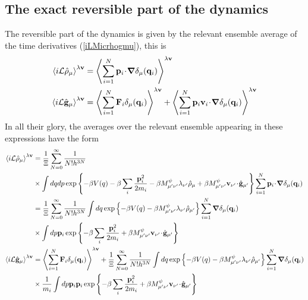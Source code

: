 \documentclass[b5paper,openright,11pt]{book}
\newcommand{\esc}{\!\cdot\!}
\newcommand{\llangle}{\left\langle}
\newcommand{\rrangle}{\right\rangle}
\begin{document}
\begin{appendices}
\section{The exact reversible part of the dynamics}
The reversible part of the dynamics  is given by the relevant ensemble
average of  the time derivatives
(\ref{iLMicrhogmu}), this is
\begin{align}
  \llangle i{\cal L}\hat{\rho}_\mu\rrangle^{\lambda{\bf v}} &=\llangle \sum_{i=1}^N{\bf p}_i\esc\boldsymbol{\nabla}\delta_\mu({\bf q}_i)\rrangle^{\lambda{\bf v}}
\nonumber\\
  \llangle i{\cal L}\hat{\bf g}_\mu\rrangle^{\lambda{\bf v}} &=
  \llangle \sum_{i=1}^N{\bf F}_i\delta_\mu({\bf q}_i)\rrangle^{\lambda{\bf v}}
+  \llangle \sum_{i=1}^N{\bf p}_i{\bf v}_i\esc\boldsymbol{\nabla}\delta_\mu({\bf q}_i)\rrangle^{\lambda{\bf v}}
\end{align}
In all their glory, the  averages over the relevant ensemble appearing
in these expressions have the form
\begin{align}
  \llangle i{\cal L}\hat{\rho}_\mu\rrangle^{\lambda{\bf v}} &= 
\frac{1}{\Xi} \sum_{N=0}^\infty \frac{1}{N!h^{3N}} \nonumber\\
&\times \int dq dp 
\exp\left\{-\beta V(q)-\beta \sum_i\frac{{\bf p}_i^2}{2m_i}-\beta M^\psi_{\mu'\nu'}\lambda_{\nu'}\hat{\rho}_{\mu}+\beta M^\psi_{\mu'\nu' }{\bf v}_{\nu'}\esc\hat{\bf g}_{\mu'}\right\}\sum_{i=1}^N{\bf p}_i\esc\boldsymbol{\nabla}\delta_\mu({\bf q}_i)
\nonumber\\
&= 
\frac{1}{\Xi} \sum_{N=0}^\infty \frac{1}{N!h^{3N}}\int dq  
\exp\left\{-\beta V(q)-\beta M^\psi_{\mu'\nu'}\lambda_{\nu'} \hat{\rho}_{\mu'}\right\}\sum_{i=1}^N\boldsymbol{\nabla}\delta_\mu({\bf q}_i)
\nonumber\\
&\times \int dp{\bf p}_i\exp\left\{-\beta \sum_i\frac{{\bf p}_i^2}{2m_i}+\beta M^\psi_{\mu'\nu'}{\bf v}_{\nu'}\esc\hat{\bf g}_{\mu'}\right\}
\nonumber\\
  \llangle i{\cal L}\hat{\bf g}_\mu\rrangle^{\lambda{\bf v}} &=
  \llangle \sum_{i=1}^N{\bf F}_i\delta_\mu({\bf q}_i)\rrangle^{\lambda{\bf v}}
+\frac{1}{\Xi} \sum_{N=0}^\infty \frac{1}{N!h^{3N}}\int dq 
\exp\left\{-\beta V(q)-\beta M^\psi_{\mu'\nu'}\lambda_{\nu'}\hat{\rho}_{\mu'}\right\}\sum_{i=1}^N\boldsymbol{\nabla}\delta_\mu({\bf q}_i)
\nonumber\\
&\times\frac{1}{m_i} \int dp{\bf p}_i{\bf p}_i\exp\left\{-\beta \sum_i\frac{{\bf p}_i^2}{2m_i}+\beta M^\psi_{\mu'\nu' }{\bf v}_{\nu'}\esc\hat{\bf g}_{\mu'}\right\}

\end{align}
\end{appendices}
\end{document}
